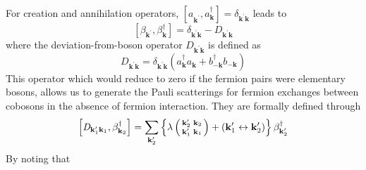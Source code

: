 \documentclass[aps,prb,superscriptaddress,twocolumn]{revtex4}
\newcommand{\vk}{\ensuremath{\mathbf{k}}}
\begin{document}
For creation and annihilation operators, $\left[a^{}_{\mathbf{k}
^{\prime}},a^{\dagger}_{\mathbf{k} {}}\right]  =\delta_{\mathbf{k} ^{\prime}%
\mathbf{k} }$ leads to 
\begin{equation}  \label{eq:betacom}
\left[\beta_{\mathbf{k} ^{\prime}},\beta^{\dagger}_{\mathbf{k} }\right] 
=\delta_{\mathbf{k} ^{\prime}\mathbf{k} }-\mathit{D} _{\mathbf{k} ^{\prime}%
\mathbf{k} }
\end{equation}
where the deviation-from-boson operator $\mathit{D} _{\mathbf{k} ^{\prime}\mathbf{k%
} }$ is defined as 
\begin{equation}  \label{eq:D}
\mathit{D} _{\mathbf{k} ^{\prime}\mathbf{k} }=\delta_{\mathbf{k} ^{\prime}%
\mathbf{k} }\left(a^{\dagger}_{\mathbf{k}}a^{}_{\mathbf{k}
}+b^{\dagger}_{-\mathbf{k} }b^{}_{-\mathbf{k}
}\right) 
\end{equation}
This operator which would reduce to zero if the fermion pairs were
elementary bosons, allows us to generate the Pauli scatterings for fermion
exchanges between cobosons in the absence of fermion interaction. They are formally defined through 
\begin{equation}
\left[\mathit{D} _{\mathbf{k} ^{\prime}_1\mathbf{k} _1},\beta^{\dagger}_{%
\mathbf{k} _2}\right]  =\sum_{\mathbf{k} ^{\prime}_2}\left\{\lambda\left(%
\begin{smallmatrix}\vk'_2&\vk_2\\\vk'_1&\vk_1\end{smallmatrix}\right) 
+\left(\mathbf{k} ^{\prime}_1\leftrightarrow\mathbf{k} ^{\prime}_2\right)
\right\} \beta^{\dagger}_{\mathbf{k} ^{\prime}_2}
\end{equation}
By noting that
\end{document}
